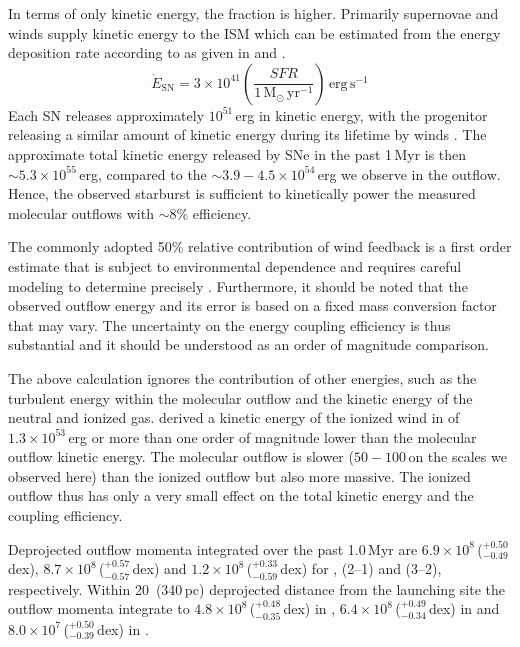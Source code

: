 In terms of only kinetic energy, the fraction is higher. Primarily supernovae and winds supply kinetic energy to the ISM which can be estimated from the energy deposition rate according to \citet{Leitherer:1999jt} as given in \citet{Chisholm:2017bu} and \citet{Murray:2005jt}.
\begin{equation}
    \dot{E}_\mathrm{SN} = 3 \times 10^{41} \left( \frac{SFR}{1\,\mathrm{M}_\odot\,\mathrm{yr}^{-1}} \right) \,\mathrm{erg\,s}^{-1}
    \label{equation: supernova energy}
\end{equation}
Each SN releases approximately $10^{51}$\,erg in kinetic energy, with the progenitor releasing a similar amount of kinetic energy during its lifetime by winds \citep[e.g.][]{Leitherer:1999jt}. The approximate total kinetic energy released by SNe in the past 1\,Myr is then $\sim 5.3 \times 10^{55}$\,erg, compared to the $\sim3.9-4.5\times10^{54}$\,erg we observe in the outflow. Hence, the observed starburst is sufficient to kinetically power the measured molecular outflows with $\sim 8\%$ efficiency.

The commonly adopted 50\% relative contribution of wind feedback is a first order estimate that is subject to environmental dependence and requires careful modeling to determine precisely \citep[e.g.][]{Leitherer:1999jt}. Furthermore, it should be noted that the observed outflow energy and its error is based on a fixed mass conversion factor that may vary. The uncertainty on the energy coupling efficiency is thus substantial and it should be understood as an order of magnitude comparison.

The above calculation ignores the contribution of other energies, such as the turbulent energy within the molecular outflow and the kinetic energy of the neutral and ionized gas. \citet{2009ApJ...701.1636M} derived a kinetic energy of the ionized wind in  of $1.3 \times 10^{53}$\,erg or more than one order of magnitude lower than the molecular outflow kinetic energy. The molecular outflow is slower ($50-100$\,\kms on the scales we observed here) than the ionized outflow \citep[up to $\sim 400$\,\kms,][]{2009ApJ...701.1636M} but also more massive. The ionized outflow thus has only a very small effect on the total kinetic energy and the coupling efficiency.

Deprojected outflow momenta integrated over the past 1.0\,Myr are $6.9 \times 10^8$\,\Msunkms ($^{+0.50}_{-0.49}$\,dex), $8.7 \times 10^8$\,\Msunkms ($^{+0.57}_{-0.57}$\,dex) and $1.2 \times 10^8$\,\Msunkms ($^{+0.33}_{-0.59}$\,dex) for , (2--1) and (3--2), respectively. Within 20\arcsec\ (340\,pc) deprojected distance from the launching site the outflow momenta integrate to $4.8 \times 10^8$\,\Msunkms ($^{+0.48}_{-0.35}$\,dex) in , $6.4 \times 10^8$\,\Msunkms ($^{+0.49}_{-0.34}$\,dex) in  and $8.0 \times 10^7$\,\Msunkms ($^{+0.50}_{-0.39}$\,dex) in .

